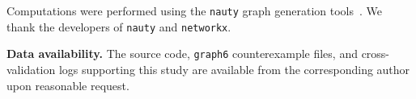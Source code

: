 \documentclass[11pt]{amsart}
\theoremstyle{definition}
\theoremstyle{remark}
\begin{document}
Computations were performed using the \texttt{nauty} graph generation
tools~\cite{McKayPiperno2014}.  We thank the developers of
\texttt{nauty} and \texttt{networkx}.

\medskip
\noindent\textbf{Data availability.}
The source code, \texttt{graph6} counterexample files, and
cross-validation logs supporting this study are available from the
corresponding author upon reasonable request.


\providecommand{\bysame}{\leavevmode\hbox to3em{\hrulefill}\thinspace}
\providecommand{\MR}{\relax\ifhmode\unskip\space\fi MR }
\providecommand{\MRhref}[2]{%
  \href{http://www.ams.org/mathscinet-getitem?mr=#1}{#2}
}
\providecommand{\href}[2]{#2}
\end{document}
